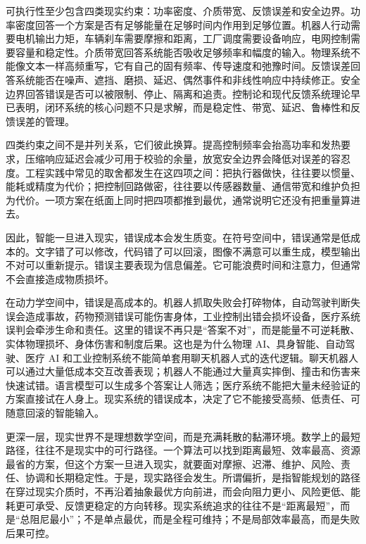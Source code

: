 可执行性至少包含四类现实约束：功率密度、介质带宽、反馈误差和安全边界。功率密度回答一个方案是否有足够能量在足够时间内作用到足够位置。机器人行动需要电机输出力矩，车辆刹车需要摩擦和距离，工厂调度需要设备响应，电网控制需要容量和稳定性。介质带宽回答系统能否吸收足够频率和幅度的输入。物理系统不能像文本一样高频重写，它有自己的固有频率、传导速度和弛豫时间。反馈误差回答系统能否在噪声、遮挡、磨损、延迟、偶然事件和非线性响应中持续修正。安全边界回答错误是否可以被限制、停止、隔离和追责。控制论和现代反馈系统理论早已表明，闭环系统的核心问题不只是求解，而是稳定性、带宽、延迟、鲁棒性和反馈误差的管理。\cite{wiener1948,astrom2008}

四类约束之间不是并列关系，它们彼此换算。提高控制频率会抬高功率和发热要求，压缩响应延迟会减少可用于校验的余量，放宽安全边界会降低对误差的容忍度。工程实践中常见的取舍都发生在这四项之间：把执行器做快，往往要以惯量、能耗或精度为代价；把控制回路做密，往往要以传感器数量、通信带宽和维护负担为代价。一项方案在纸面上同时把四项都推到最优，通常说明它还没有把重量算进去。

因此，智能一旦进入现实，错误成本会发生质变。在符号空间中，错误通常是低成本的。文字错了可以修改，代码错了可以回滚，图像不满意可以重生成，模型输出不对可以重新提示。错误主要表现为信息偏差。它可能浪费时间和注意力，但通常不会直接造成物质损坏。

在动力学空间中，错误是高成本的。机器人抓取失败会打碎物体，自动驾驶判断失误会造成事故，药物预测错误可能伤害身体，工业控制出错会损坏设备，医疗系统误判会牵涉生命和责任。这里的错误不再只是“答案不对”，而是能量不可逆耗散、实体物理损坏、身体伤害和制度后果。这也是为什么物理 AI、具身智能、自动驾驶、医疗 AI 和工业控制系统不能简单套用聊天机器人式的迭代逻辑。聊天机器人可以通过大量低成本交互改善表现；机器人不能通过大量真实摔倒、撞击和伤害来快速试错。语言模型可以生成多个答案让人筛选；医疗系统不能把大量未经验证的方案直接试在人身上。现实系统的错误成本，决定了它不能接受高频、低责任、可随意回滚的智能输入。


更深一层，现实世界不是理想数学空间，而是充满耗散的黏滞环境。数学上的最短路径，往往不是现实中的可行路径。一个算法可以找到距离最短、效率最高、资源最省的方案，但这个方案一旦进入现实，就要面对摩擦、迟滞、维护、风险、责任、协调和长期稳定性。于是，现实路径会发生。所谓偏折，是指智能规划的路径在穿过现实介质时，不再沿着抽象最优方向前进，而会向阻力更小、风险更低、能耗更可承受、反馈更稳定的方向转移。现实系统追求的往往不是“距离最短”，而是“总阻尼最小”；不是单点最优，而是全程可维持；不是局部效率最高，而是失败后果可控。

